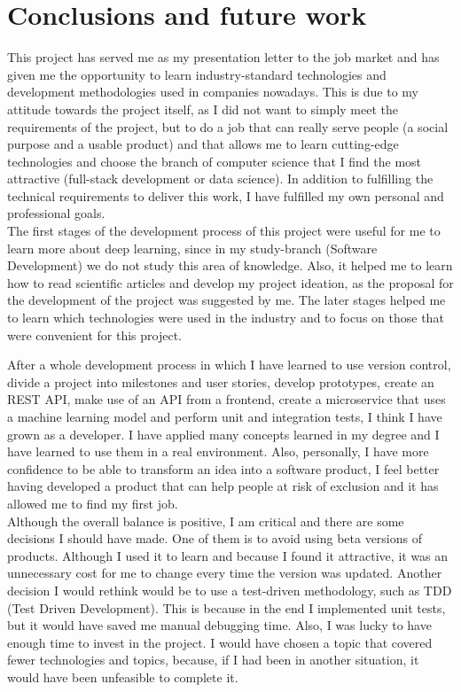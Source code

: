 \chapter{Conclusions and future work}

This project has served me as my presentation letter to the job market and has given me the opportunity to learn industry-standard 
technologies and development methodologies used in companies nowadays. This is due to my attitude towards the project itself, as I 
did not want to simply meet the requirements of the project, but to do a job that can really serve people (a social purpose and a 
usable product) and that allows me to learn cutting-edge technologies and choose the branch of computer science that I find the most 
attractive (full-stack development or data science).
In addition to fulfilling the technical requirements to deliver this work, I have fulfilled my own personal and professional goals. \\

The first stages of the development process of this project were useful for me to learn more about deep learning, since in my study-branch 
(Software Development) we do not study this area of knowledge. Also, it helped me to learn how to read scientific articles and develop my 
project ideation, as the proposal for the development of the project was suggested by me.
The later stages helped me to learn which technologies were used in the industry and to focus on those that were convenient for this project. 

After a whole development process in which I have learned to use version control, divide a project into milestones and user stories, 
develop prototypes, create an REST API, make use of an API from a frontend, create a microservice that uses a machine learning model and 
perform unit and integration tests, I think I have grown as a developer. I have applied many concepts learned in my degree and I have 
learned to use them in a real environment. Also, personally, I have more confidence to be able to transform an idea into a software product, 
I feel better having developed a product that can help people at risk of exclusion and it has allowed me to find my first job. \\

Although the overall balance is positive, I am critical and there are some decisions I should have made. 
One of them is to avoid using beta versions of products. Although I used it to learn and because I found it attractive, it was an unnecessary 
cost for me to change every time the version was updated.
Another decision I would rethink would be to use a test-driven methodology, such as TDD (Test Driven Development). 
This is because in the end I implemented unit tests, but it would have saved me manual debugging time.
Also, I was lucky to have enough time to invest in the project. I would have chosen a topic that covered fewer technologies and topics, 
because, if I had been in another situation, it would have been unfeasible to complete it. \\

